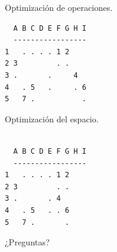 \documentclass{beamer}
\begin{document}
\begin{frame}[fragile]
Optimización de operaciones.
\begin{lstlisting}
  A B C D E F G H I
  -----------------
1   . . . . 1 2    
2 3         . .       
3 .       .     4    
4   . 5   .     . 6
5   7 .           .
\end{lstlisting}
Optimización del espacio.
\begin{lstlisting}

  A B C D E F G H I
  -----------------
1   . . . . 1 2    
2 3         . .    
3 .       . 4      
4   . 5   . . 6    
5   7 .       .    
\end{lstlisting}
\end{frame}



\begin{frame}

\end{frame}



\begin{frame}
\center ¿Preguntas?
\end{frame}
\end{document}
